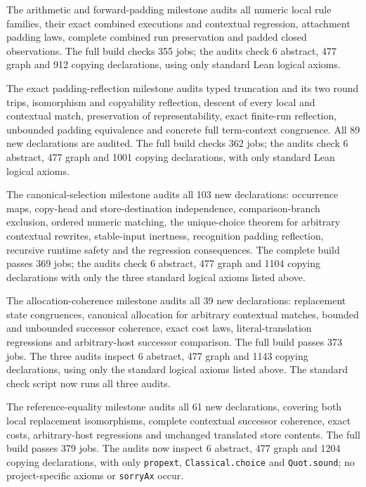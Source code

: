 The arithmetic and forward-padding milestone audits all numeric local rule
families, their exact combined executions and contextual regression, attachment
padding laws, complete combined run preservation and padded closed observations.
The full build checks 355 jobs; the audits check 6 abstract, 477 graph and
912 copying declarations, using only standard Lean logical axioms.


The exact padding-reflection milestone audits typed truncation and its two
round trips, isomorphism and copyability reflection, descent of every local
and contextual match, preservation of representability, exact finite-run
reflection, unbounded padding equivalence and concrete full term-context
congruence. All 89 new declarations are audited. The full build checks 362
jobs; the audits check 6 abstract, 477 graph and 1001 copying declarations,
with only standard Lean logical axioms.


The canonical-selection milestone audits all 103 new declarations: occurrence
maps, copy-head and store-destination independence, comparison-branch
exclusion, ordered numeric matching, the unique-choice theorem for arbitrary
contextual rewrites, stable-input inertness, recognition padding reflection,
recursive runtime safety and the regression consequences. The complete build
passes 369 jobs; the audits check 6 abstract, 477 graph and 1104 copying
declarations with only the three standard logical axioms listed above.


The allocation-coherence milestone audits all 39 new declarations: replacement
state congruences, canonical allocation for arbitrary contextual matches,
bounded and unbounded successor coherence, exact cost laws, literal-translation
regressions and arbitrary-host successor comparison. The full build passes
373 jobs. The three audits inspect 6 abstract, 477 graph and 1143 copying
declarations, using only the standard logical axioms listed above. The standard
check script now runs all three audits.


The reference-equality milestone audits all 61 new declarations, covering both
local replacement isomorphisms, complete contextual successor coherence,
exact costs, arbitrary-host regressions and unchanged translated store contents.
The full build passes 379 jobs. The audits now inspect 6 abstract, 477 graph
and 1204 copying declarations, with only \texttt{propext},
\texttt{Classical.choice} and \texttt{Quot.sound}; no project-specific axioms
or \texttt{sorryAx} occur.


